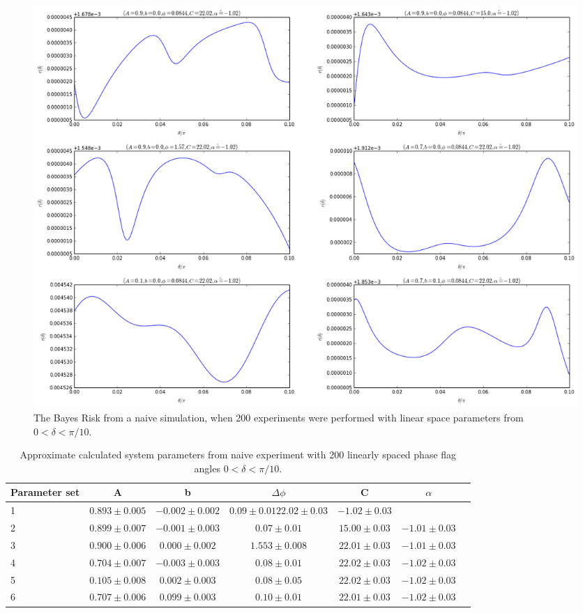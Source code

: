 \begin{figure}[ht!]
\centering
\includegraphics[width=\textwidth , height=0.8\textheight]{Figures/naive200.png}
\caption{The Bayes Risk from a naive simulation, when 200 experiments were performed with linear space parameters from $0<\delta<\pi/10$.}
\label{fig:naive200}
\end{figure}
\begin{table}[h]
\tiny
\begin{center}
\begin{tabular}{l*{5}{c}r}
Parameter set & A&b& $\Delta\phi$ & C & $\alpha$ \\
\hline

1&$0.893 ± 0.005$&$	 -0.002 ± 0.002	$&$	 0.09 ± 0.01	 22.02 ± 0.03	$&$	 -1.02 ± 0.03$\\

2&$0.899 ± 0.007	$&$	 -0.001 ± 0.003$&$		 0.07± 0.01	$&$	 15.00 ± 0.03	$&$	 -1.01 ± 0.03$\\	

3& $0.900 ± 0.006$&$		 0.000 ± 0.002	$&$	 1.553 ± 0.008$&$	 22.01 ± 0.03$&$	 -1.01 ± 0.03$ \\	

4&$0.704 ± 0.007	$&$	 -0.003 ± 0.003	$&$	 0.08 ± 0.01	$&$	 22.02 ± 0.03	$&$	 -1.02 ± 0.03$ \\

5&$0.105 ± 0.008	 $&$	0.002 ± 0.003$&$		 0.08 ± 0.05	 $&$	22.02 ± 0.03	$&$	 -1.02 ± 0.03$ \\

6&$0.707 ± 0.006	$&$	 0.099 ± 0.003	$&$	 0.10 ± 0.01	$&$	 22.01 ± 0.03$&$		 -1.02 ± 0.03$\\	

\end{tabular}
\caption{Approximate calculated system parameters from naive experiment with 200 linearly spaced phase flag angles $0<\delta<\pi/10$.}
\label{tab:naive200}
\end{center}
\end{table}
